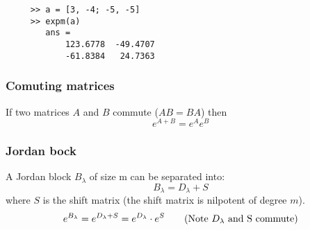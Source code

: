\begin{matlab}
    \begin{lstlisting}
     >> a = [3, -4; -5, -5]
     >> expm(a)
        ans =
            123.6778  -49.4707
            -61.8384   24.7363
    \end{lstlisting}
\end{matlab}
\subsubsection{Comuting matrices}
If two matrices \(A\) and \(B\) commute (\(AB = BA\)) then
\begin{equation}
    e^{A + B} = e^{A}e^{B}
\end{equation}
\subsubsection{Jordan bock}
A Jordan block \(B_{\lambda}\) of size m can be separated into:
\begin{equation}
    B_{\lambda} = D_{\lambda} + S
\end{equation}
where \(S\) is the shift matrix (the shift matrix is nilpotent of degree \(m\)).
\begin{align}
    e^{B_\lambda} = e^{D_{\lambda} + S} =  e^{D_{\lambda}} \cdot e^{S} \tag{Note \(D_{\lambda} \) and S commute}
\end{align}
